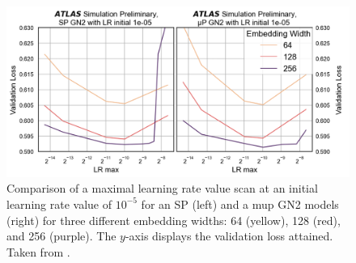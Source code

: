 \begin{figure}[h!]
  \centering
  \includegraphics[width=\textwidth]{Images/FTAG/GN/HPO/maincompmupsp.png}
  \caption{Comparison of a maximal learning rate value scan at an initial learning rate value of $10^{-5}$ for an SP (left) and a \gls{mup} GN2 models (right) for three different embedding widths: 64 (yellow), 128 (red), and 256 (purple). The $y$-axis displays the validation loss attained. Taken from \cite{publicplotMUP}.}
  \label{fig:maincompmupsp}
\end{figure} 


